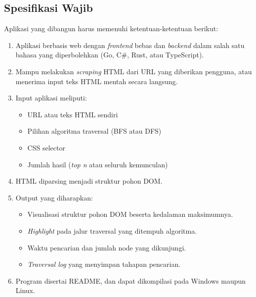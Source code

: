 \subsection{Spesifikasi Wajib}
Aplikasi yang dibangun harus memenuhi ketentuan-ketentuan berikut:
\begin{enumerate}
    \item Aplikasi berbasis web dengan \textit{frontend} bebas dan \textit{backend} dalam salah satu bahasa yang diperbolehkan (Go, C\#, Rust, atau TypeScript).
    \item Mampu melakukan \textit{scraping} HTML dari URL yang diberikan pengguna, atau menerima input teks HTML mentah secara langsung.
    \item Input aplikasi meliputi:
    \begin{itemize}
        \item URL atau teks HTML sendiri
        \item Pilihan algoritma traversal (BFS atau DFS)
        \item CSS selector
        \item Jumlah hasil (\textit{top n} atau seluruh kemunculan)
    \end{itemize}
    \item HTML diparsing menjadi struktur pohon DOM.
    \item Output yang diharapkan:
    \begin{itemize}
        \item Visualisasi struktur pohon DOM beserta kedalaman maksimumnya.
        \item \textit{Highlight} pada jalur traversal yang ditempuh algoritma.
        \item Waktu pencarian dan jumlah node yang dikunjungi.
        \item \textit{Traversal log} yang menyimpan tahapan pencarian.
    \end{itemize}
    \item Program disertai README, dan dapat dikompilasi pada Windows maupun Linux.
\end{enumerate}

